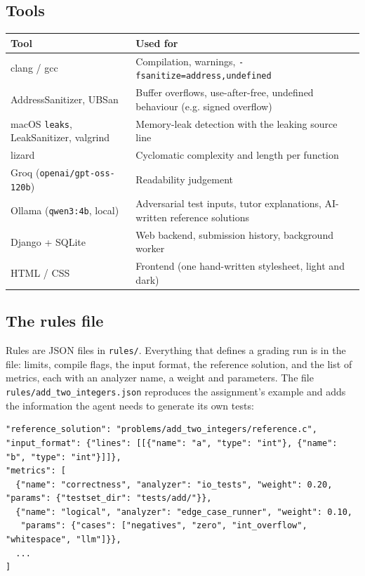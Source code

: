 \documentclass[11pt,a4paper]{article}
\newcommand{\file}[1]{\nolinkurl{#1}}
\begin{document}
\subsection{Tools}
\noindent\begin{tabularx}{\textwidth}{@{}P{4.6cm}L@{}}
\toprule
\textbf{Tool} & \textbf{Used for} \\
\midrule
clang / gcc & Compilation, warnings, \texttt{-fsanitize=address,undefined} \\
AddressSanitizer, UBSan & Buffer overflows, use-after-free, undefined behaviour (e.g. signed overflow) \\
macOS \texttt{leaks}, LeakSanitizer, valgrind & Memory-leak detection with the leaking source line \\
lizard & Cyclomatic complexity and length per function \\
Groq (\texttt{openai/gpt-oss-120b}) & Readability judgement \\
Ollama (\texttt{qwen3:4b}, local) & Adversarial test inputs, tutor explanations, AI-written reference solutions \\
Django + SQLite & Web backend, submission history, background worker \\
HTML / CSS & Frontend (one hand-written stylesheet, light and dark) \\
\bottomrule
\end{tabularx}

\subsection{The rules file}\label{sec:rules}
Rules are JSON files in \file{rules/}. Everything that defines a grading run is in the file: limits, compile flags,
the input format, the reference solution, and the list of metrics, each with an analyzer name, a weight and parameters.
The file \file{rules/add_two_integers.json} reproduces the assignment's example and adds the information the agent
needs to generate its own tests:

\begin{lstlisting}
"reference_solution": "problems/add_two_integers/reference.c",
"input_format": {"lines": [[{"name": "a", "type": "int"}, {"name": "b", "type": "int"}]]},
"metrics": [
  {"name": "correctness", "analyzer": "io_tests", "weight": 0.20, "params": {"testset_dir": "tests/add/"}},
  {"name": "logical", "analyzer": "edge_case_runner", "weight": 0.10,
   "params": {"cases": ["negatives", "zero", "int_overflow", "whitespace", "llm"]}},
  ...
]
\end{lstlisting}
\end{document}
